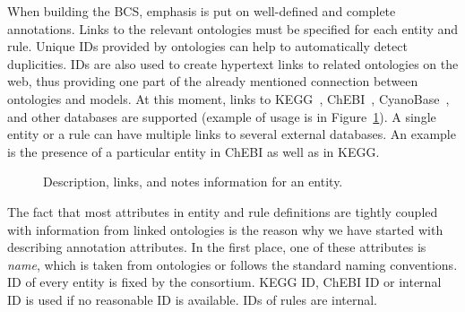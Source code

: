 \documentclass[12pt, twoside]{fithesis2} %
\begin{document}
When building the BCS, emphasis is put on well-defined and complete annotations. Links to the relevant ontologies must be specified for each entity and rule. Unique IDs provided by ontologies can help to automatically detect duplicities. IDs are also used to create hypertext links to related ontologies on the web, thus providing one part of the already mentioned connection between ontologies and models. At this moment, links to KEGG~\cite{Kanehisa04012016}, ChEBI~\cite{ChEBI}, CyanoBase~\cite{CyanoBase}, and other databases are supported (example of usage is in Figure~\ref{database_links}). A single entity or a rule can have multiple links to several external databases. An example is the presence of a particular entity in ChEBI as well as in KEGG.

\begin{figure}[!h]
\begin{center}
\end{center}
\caption{Description, links, and notes information for an entity.}\label{database_links}
\end{figure}

The fact that most attributes in entity and rule definitions are tightly coupled with information from linked ontologies is the reason why we have started with describing annotation attributes. In the first place, one of these attributes is \emph{name}, which is taken from ontologies or follows the standard naming conventions. ID of every entity is fixed by the consortium. KEGG ID, ChEBI ID or internal ID is used if no reasonable ID is available. IDs of rules are internal.
\end{document}
